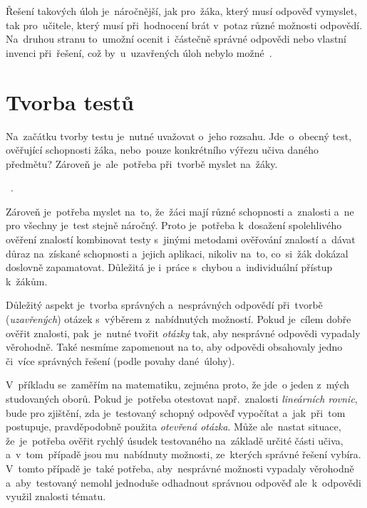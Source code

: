 \documentclass[11pt,a4paper]{report}
\begin{document}
            Řešení takových úloh je~náročnější, jak pro~žáka, který musí odpověď vymyslet, tak pro~učitele, který musí při~hodnocení brát v~potaz různé možnosti odpovědí. Na~druhou stranu to~umožní ocenit i~částečně správné odpovědi nebo vlastní invenci při~řešení, což by~u~uzavřených úloh nebylo možné~\cite{rozhlasOUtazky}.

        \section{Tvorba testů}
            Na~začátku tvorby testu je~nutné uvažovat o~jeho rozsahu. Jde~o~obecný test, ověřující schopnosti žáka, nebo~pouze konkrétního výřezu učiva daného předmětu?
            Zároveň je~ale~potřeba při~tvorbě myslet na~žáky.

            ~\cite{Suchoradsky:testy}.

            Zároveň je~potřeba myslet na~to, že~žáci mají různé schopnosti a~znalosti a~ne pro všechny je~test stejně náročný. Proto je~potřeba k~dosažení spolehlivého ověření znalostí kombinovat testy s~jinými metodami ověřování znalostí a~dávat důraz na~získané schopnosti a~jejich aplikaci, nikoliv na~to, co~si~žák dokázal doslovně zapamatovat. Důležitá je i~práce s~chybou a~individuální přístup k~žákům. \cite{chraska:testy, Berkley2017LearningFromErrors}
            
            Důležitý aspekt je~tvorba správných a~nesprávných odpovědí při~tvorbě (\emph{uzavřených}) otázek s~výběrem z~nabídnutých možností. Pokud je~cílem dobře ověřit znalosti, pak~je~nutné tvořit \emph{otázky} tak, aby nesprávné odpovědi vypadaly věrohodně. Také nesmíme zapomenout na to, aby odpovědi obsahovaly jedno či~více správných řešení (podle povahy dané~úlohy).

            V~příkladu se~zaměřím na matematiku, zejména proto, že jde~o jeden z~mých studovaných oborů. Pokud je~potřeba otestovat např.~znalosti \emph{lineárních rovnic}, bude pro zjištění, zda je~testovaný schopný odpověď vypočítat a~jak~při~tom postupuje, pravděpodobně použita \emph{otevřená otázka}. Může ale~nastat situace, že~je~potřeba ověřit rychlý úsudek testovaného na~základě určité části učiva, a~v~tom~případě jsou mu~nabídnuty možnosti, ze~kterých správné řešení vybíra. V~tomto případě je~také potřeba, aby~nesprávné možnosti vypadaly věrohodně a~aby~testovaný nemohl jednoduše odhadnout správnou odpověď ale~k~odpovědi využil znalosti tématu.
\end{document}
